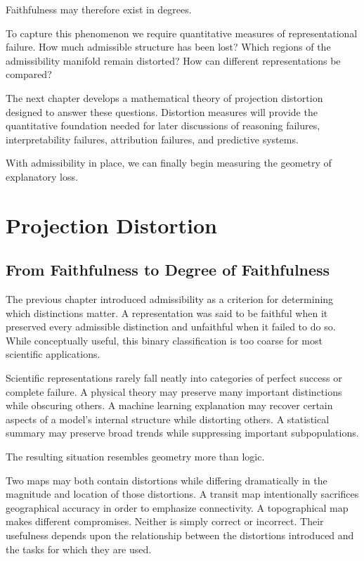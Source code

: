 \documentclass[11pt,oneside,openany]{book}
\begin{document}
Faithfulness may therefore exist in degrees.

To capture this phenomenon we require quantitative measures of representational failure. How much admissible structure has been lost? Which regions of the admissibility manifold remain distorted? How can different representations be compared?

The next chapter develops a mathematical theory of projection distortion designed to answer these questions. Distortion measures will provide the quantitative foundation needed for later discussions of reasoning failures, interpretability failures, attribution failures, and predictive systems.

With admissibility in place, we can finally begin measuring the geometry of explanatory loss.

\chapter{Projection Distortion}

\section{From Faithfulness to Degree of Faithfulness}

The previous chapter introduced admissibility as a criterion for determining which distinctions matter. A representation was said to be faithful when it preserved every admissible distinction and unfaithful when it failed to do so. While conceptually useful, this binary classification is too coarse for most scientific applications.

Scientific representations rarely fall neatly into categories of perfect success or complete failure. A physical theory may preserve many important distinctions while obscuring others. A machine learning explanation may recover certain aspects of a model's internal structure while distorting others. A statistical summary may preserve broad trends while suppressing important subpopulations.

The resulting situation resembles geometry more than logic.

Two maps may both contain distortions while differing dramatically in the magnitude and location of those distortions. A transit map intentionally sacrifices geographical accuracy in order to emphasize connectivity. A topographical map makes different compromises. Neither is simply correct or incorrect. Their usefulness depends upon the relationship between the distortions introduced and the tasks for which they are used.
\end{document}
